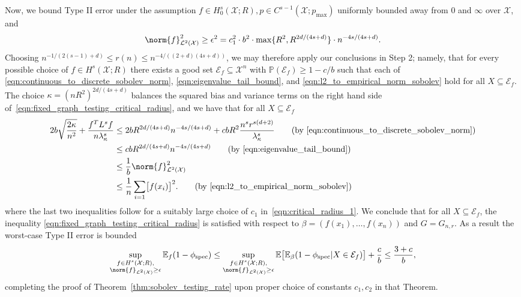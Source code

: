 \documentclass{article}
\newcommand{\1}{\mathbf{1}}
\newcommand{\Xset}{\mathcal{X}}
\newcommand{\Leb}{\mathcal{L}}
\newcommand{\Pbb}{\mathbb{P}}
\newcommand{\spec}{\mathrm{spec}}
\theoremstyle{alden}
\theoremstyle{aldenthm}
\theoremstyle{definition}
\theoremstyle{remark}
\begin{document}
Now, we bound Type II error under the assumption $f \in H_0^{s}(\mathcal{X};R), p \in C^{s - 1}(\Xset;p_{\max})$ uniformly bounded away from $0$ and $\infty$ over $\Xset$, and 
\begin{equation}
\label{eqn:critical_radius_1}
\norm{f}_{\Leb^2(\Xset)}^2 \geq \epsilon^2 = c_1^2 \cdot b^2 \cdot \max\{R^2,R^{2d/(4s + d)}\} \cdot n^{-4s/(4s + d)}.
\end{equation}
Choosing $n^{-1/(2(s - 1) + d)}\leq r(n) \leq n^{-4/((2+d)(4s + d))}$, we may therefore apply our conclusions in Step 2; namely, that for every possible choice of $f \in H^s(\Xset;R)$ there exists a good set $\mathcal{E}_f \subseteq \Xset^n$ with $\Pbb(\mathcal{E}_f) \geq 1 - c/b$ such that each of \eqref{eqn:continuous_to_discrete_sobolev_norm}, \eqref{eqn:eigenvalue_tail_bound}, and \eqref{eqn:l2_to_empirical_norm_sobolev} hold for all $X \subseteq \mathcal{E}_f$. The choice $\kappa = (nR^2)^{2d/(4s + d)}$ balances the squared bias and variance terms on the right hand side of~\eqref{eqn:fixed_graph_testing_critical_radius}, and we have that for all $X \subseteq \mathcal{E}_f$
\begin{align*}
2b\sqrt{\frac{2\kappa}{n^2}} + \frac{f^T L^s f}{n\lambda_{\kappa}^s} & \leq 2bR^{2d/(4s + d)}n^{-4s/(4s+d)} + cbR^2\frac{n^{s} r^{s(d + 2)}}{\lambda_{\kappa}^s} \tag{by \eqref{eqn:continuous_to_discrete_sobolev_norm}} \\
& \leq cbR^{2d/(4s + d)}n^{-4s/(4s+d)} \tag{by \eqref{eqn:eigenvalue_tail_bound}} \\
& \leq \frac{1}{b}\norm{f}_{\Leb^2(\Xset)}^2 \\
& \leq \frac{1}{n}\sum_{i = 1} \bigl[f(x_i)\bigr]^2. \tag{by \eqref{eqn:l2_to_empirical_norm_sobolev}}
\end{align*}
where the last two inequalities follow for a suitably large choice of $c_1$ in~\eqref{eqn:critical_radius_1}.
We conclude that for all $X \subseteq \mathcal{E}_f$, the inequality \eqref{eqn:fixed_graph_testing_critical_radius} is satisfied with respect to $\beta = (f(x_1),\ldots,f(x_n))$ and $G = G_{n,r}$. As a result the worst-case Type II error is bounded
\begin{equation*}
\sup_{\substack{f \in H^s(\Xset;R), \\ \norm{f}_{\Leb^2(\Xset)} \geq \epsilon}}\mathbb{E}_{f}(1 - \phi_{\spec}) \leq \sup_{\substack{f \in H^s(\Xset;R), \\ \norm{f}_{\Leb^2(\Xset)} \geq \epsilon}} \mathbb{E}\bigl[\mathbb{E}_{\beta}(1 - \phi_{\spec}|X \in \mathcal{E}_f)\bigr] + \frac{c}{b} \leq \frac{3 + c}{b},
\end{equation*}
completing the proof of Theorem~\ref{thm:sobolev_testing_rate} upon proper choice of constants $c_1,c_2$ in that Theorem.
\end{document}
